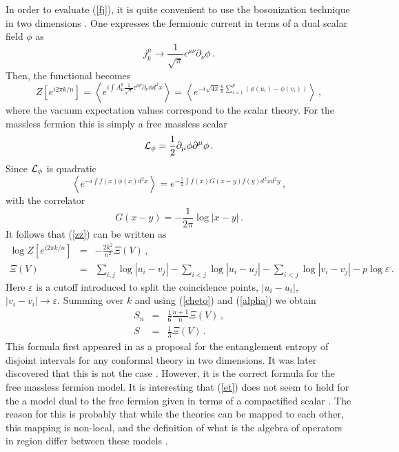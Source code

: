 \documentclass[a4paper]{article}
\begin{document}
In order to evaluate (\ref{fj}), it is quite convenient to use the
bosonization technique in two dimensions \cite{fermion}. 
One expresses the fermionic current in terms of a dual scalar field $\phi$ as 
\begin{equation}
j_{k}^{\mu }\to \frac{1}{\sqrt{\pi }}\epsilon ^{\mu \nu }\partial_{\nu}\phi\,.
\end{equation}
Then, the functional becomes
\begin{equation}
Z[e^{i 2 \pi k/n}]=\left\langle e^{i\int A_{\mu }^{k}\frac{1}{\sqrt{\pi }}\epsilon ^{\mu
\nu }\partial _{\nu}\phi d^{2}x}\right\rangle =\left\langle e^{-i\sqrt{4\pi }
\frac{k}{n}\sum_{i=1}^{p}\left( \phi (u_{i})-\phi (v_{i})\right)
}\right\rangle \,,
\label{zz}
\end{equation}
where the vacuum expectation values correspond to the scalar
theory.  For the massless fermion this is simply a free massless scalar
\begin{equation}
{\cal L}_\phi=\frac{1}{2} \partial_\mu \phi \partial ^\mu \phi\,.
\end{equation}
 Since ${\cal L}_\phi$ is quadratic
\begin{equation}
\left\langle e^{-i\int f(x)\phi (x)d^{2}x}\right\rangle =e^{-\frac{1}{2}\int
f(x)G(x-y)f(y)d^{2}xd^{2}y}\,,
\end{equation}
with the correlator 
\begin{equation}
G(x-y)=-\frac{1}{2\pi }\log \left| x-y\right| \,.
\end{equation}
It follows that (\ref{zz}) can be written as
\begin{eqnarray}
\log Z[e^{i 2 \pi k/n}] &=&-\frac{2k^{2}}{n^{2}}\Xi \left( V\right) \,, \\
\Xi \left( V\right) &=&\sum_{i,j}\log
\left| u_{i}-v_{j}\right|-\sum_{i<j}\log \left|
u_{i}-u_{j}\right| -\sum_{i<j}\log \left| v_{i}-v_{j}\right|  -p\log \varepsilon  \,.
\end{eqnarray}
Here $\varepsilon $ is a cutoff introduced to split the coincidence points, $
\left| u_{i}-u_{i}\right| $, $\left| v_{i}-v_{i}\right| \to \varepsilon $. Summing
over $k$ and using (\ref{cheto}) and (\ref{alpha}) we obtain
\begin{eqnarray}
S_n &=& \frac{1}{6} \frac{n+1}{n}
 \Xi \left( V\right) \,,\label{popopo} \\
S &=&\frac{1}{3}\Xi \left( V\right) \,.  \label{et}
\end{eqnarray}
This formula first appeared in \cite{cc} as a proposal for the entanglement
entropy of disjoint intervals for any conformal theory in two dimensions. It was later discovered that this is not the case \cite{cg}. However, it is the correct formula for the free massless fermion model. It is interesting that (\ref{et}) does not seem to hold for the a model dual to the free fermion given in terms of a compactified scalar \cite{rems}. The reason for this is probably that while the theories can be mapped to each other, this mapping is non-local, and the definition of what is the algebra of operators in region differ between these models \cite{furu}. 
\end{document}
